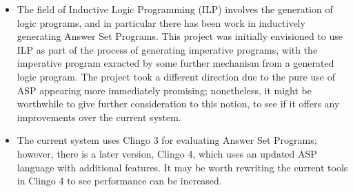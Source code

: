 \documentclass[a4paper,twoside,notitlepage]{report}
\begin{document}
\begin{itemize}
    \item The field of Inductive Logic Programming (ILP) involves the generation of 
    logic programs, and in particular there has been work in inductively generating 
    Answer Set Programs\cite{ilasp}. This project was initially envisioned to use ILP 
    as part of the process of generating imperative programs, with the imperative 
    program exracted by some further mechanism from a generated logic program. The 
    project took a different direction due to the pure use of ASP appearing more 
    immediately promising; nonetheless, it might be worthwhile to give further 
    consideration to this notion, to see if it offers any improvements over the current 
    system.

    \item The current system uses Clingo 3 for evaluating Answer Set Programs; however, 
    there is a later version, Clingo 4, which uses an updated ASP language with 
    additional features. It may be worth rewriting the current tools in Clingo 4 to see 
    performance can be increased.
\end{itemize}
\end{document}
